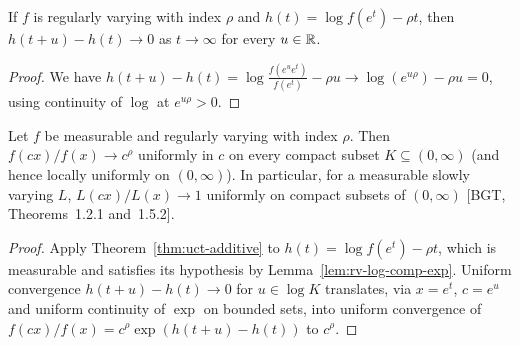 \begin{lemma}
  \label{lem:rv-log-comp-exp}
  \leanok
  If $f$ is regularly varying with index $\rho$ and $h(t) = \log f(e^t) - \rho t$,
  then $h(t+u) - h(t) \to 0$ as $t \to \infty$ for every $u \in \mathbb{R}$.
\end{lemma}
\begin{proof}
  \leanok
  We have $h(t+u) - h(t) = \log \frac{f(e^u e^t)}{f(e^t)} - \rho u \to \log(e^{u\rho}) - \rho u = 0$,
  using continuity of $\log$ at $e^{u\rho} > 0$.
\end{proof}

\begin{theorem}
  \label{thm:rv-uct-measurable}
  \leanok
  Let $f$ be measurable and regularly varying with index $\rho$. Then
  $f(cx)/f(x) \to c^\rho$ uniformly in $c$ on every compact subset $K \subseteq (0,\infty)$
  (and hence locally uniformly on $(0,\infty)$). In particular, for a measurable slowly
  varying $L$, $L(cx)/L(x) \to 1$ uniformly on compact subsets of $(0,\infty)$
  [BGT, Theorems~1.2.1 and~1.5.2].
\end{theorem}
\begin{proof}
  \leanok
  Apply Theorem~\ref{thm:uct-additive} to $h(t) = \log f(e^t) - \rho t$, which is
  measurable and satisfies its hypothesis by Lemma~\ref{lem:rv-log-comp-exp}. Uniform
  convergence $h(t + u) - h(t) \to 0$ for $u \in \log K$ translates, via $x = e^t$, $c = e^u$
  and uniform continuity of $\exp$ on bounded sets, into uniform convergence of
  $f(cx)/f(x) = c^\rho \exp(h(t+u) - h(t))$ to $c^\rho$.
\end{proof}

